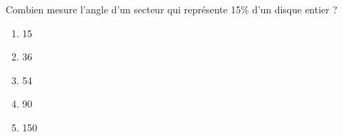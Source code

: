 Combien mesure l'angle d'un secteur qui représente 15\% d'un disque entier ?
\begin{multicols}{5}
  \begin{enumerate}[A/]
  \item 15\degres
  \item 36\degres
  \item 54\degres
  \item 90\degres
  \item 150\degres
  \end{enumerate}
\end{multicols}